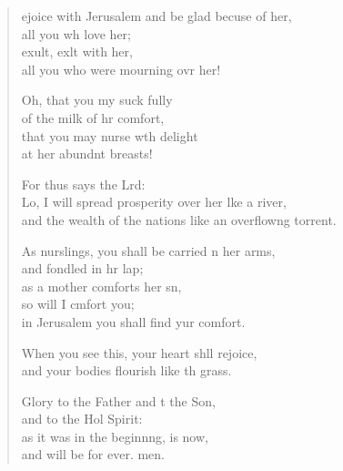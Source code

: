 \settowidth{\versewidth}{and the wealth of the nations like an overflowing torrent.}
\begin{verse}%
  \begin{patverse}
ejoice with Jerusalem and be glad becuse of her,\Med\\
all you wh love her;\\
exult, exlt with her,\Med\\
all you who were mourning ovr her!

Oh, that you my suck fully\Med\\
of the milk of hr comfort,\\
that you may nurse wth delight\Med\\
at her abundnt breasts!

For thus says the Lrd:\Flex\\
Lo, I will spread prosperity over her lke a river,\Med\\
and the wealth of the nations like an overflow\pointup{\i}ng torrent.

As nurslings, you shall be carried n her arms,\Med\\
and fondled in hr lap;\\
as a mother comforts her sn,\Flex\\
so will I cmfort you;\Med\\
in Jerusalem you shall find yur comfort.

When you see this, your heart shll rejoice,\Med\\
and your bodies flourish like th grass.

Glory to the Father and t the Son,\Med\\
and to the Hol Spirit:\\
as it was in the beginnng, is now,\Med\\
and will be for ever. men.
  \end{patverse}
\end{verse}
